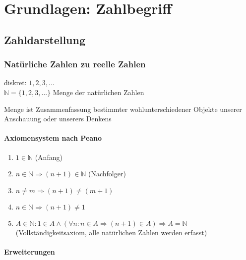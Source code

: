\chapter{Grundlagen: Zahlbegriff}



\section{Zahldarstellung}
\subsection{Natürliche Zahlen zu reelle Zahlen}
diskret: $1,2,3,...$\\
$\mathbb{N} = \{1,2,3,...\}$ Menge der natürlichen Zahlen
\begin{definition}
 Menge ist Zusammenfassung bestimmter wohlunterschiedener Objekte unserer Anschauung oder unserers Denkens
\end{definition}

\subsubsection*{Axiomensystem nach Peano}
\begin{enumerate}
 \item $1 \in \mathbb{N}$ (Anfang)
 \item $n \in \mathbb{N} \Rightarrow (n+1) \in \mathbb{N}$ (Nachfolger)
 \item $n \neq m \Rightarrow (n+1) \neq (m+1)$
 \item $n \in \mathbb{N} \Rightarrow (n+1) \neq 1$
 \item $A \in \mathbb{N}: 1 \in A \land (\forall n: n \in A \Rightarrow (n+1) \in A) \Rightarrow A = \mathbb{N}$ (Vollständigkeitsaxiom, alle natürlichen Zahlen werden erfasst)
\end{enumerate}

\subsubsection*{Erweiterungen}

